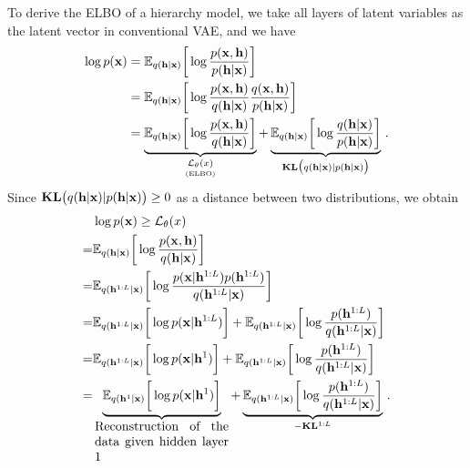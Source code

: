 \documentclass{article} %
\begin{document}
To derive the ELBO of a hierarchy model, we take all  layers of latent variables as the latent vector in conventional VAE, and we have 
\begin{align*}
\log p(\mathbf{x}) &=  \mathbb{E}_{q(\mathbf{h} | \mathbf{x})} \bigg[ \log  \frac{p(\mathbf{x}, \mathbf{h})}{p(\mathbf{h}|\mathbf{x})} \bigg] \\
&=  \mathbb{E}_{q(\mathbf{h} | \mathbf{x})} \bigg[ \log  \frac{p(\mathbf{x}, \mathbf{h})}{q(\mathbf{h}|\mathbf{x})}   \frac{q(\mathbf{x}, \mathbf{h})}{p(\mathbf{h}|\mathbf{x})} \bigg] \\
&=  \underbrace{\mathbb{E}_{q(\mathbf{h} | \mathbf{x})} \bigg[ \log  \frac{p(\mathbf{x}, \mathbf{h})}{q(\mathbf{h}|\mathbf{x})}  \bigg]}_{\underset{\text{(ELBO)}}{\mathcal{L}_{\theta}(x)}} +   \underbrace{\mathbb{E}_{q(\mathbf{h} | \mathbf{x})} \bigg[ \log \frac{q(\mathbf{h} |\mathbf{x})}{p(\mathbf{h}|\mathbf{x})} \bigg]}_{\textbf{\text{KL}}\big(q(\mathbf{h} |\mathbf{x}) | p(\mathbf{h}|\mathbf{x})\big)} \, .
\end{align*}
Since $\textbf{\text{KL}}\big(q(\mathbf{h} |\mathbf{x}) | p(\mathbf{h}|\mathbf{x})\big) \geq 0$ as a distance between two distributions, we obtain
\begin{align}  \label{eq:tree_elbo}
&\log p(\mathbf{x})  \geq  \mathcal{L}_{\theta}(x) \\  \notag
=&  \mathbb{E}_{q(\mathbf{h} | \mathbf{x})} \bigg[ \log  \frac{p(\mathbf{x}, \mathbf{h})}{q(\mathbf{h}|\mathbf{x})}  \bigg]  \\  \notag
=&  \mathbb{E}_{q(\mathbf{h}^{1:L} | \mathbf{x})} \bigg[ \log  \frac{p(\mathbf{x} | \mathbf{h}^{1:L}) p( \mathbf{h}^{1:L})}{q(\mathbf{h}^{1:L}|\mathbf{x})}  \bigg]  \\   \notag
 =&  \mathbb{E}_{q(\mathbf{h}^{1:L} | \mathbf{x})} \bigg[  \log p(\mathbf{x} | \mathbf{h}^{1:L})  \bigg]  +  \mathbb{E}_{q(\mathbf{h}^{1:L} | \mathbf{x})} \bigg[ \log   \frac{p( \mathbf{h}^{1:L})}{q(\mathbf{h}^{1:L}|\mathbf{x})}  \bigg]   \\    \label{eq:layer0_a}
=&  \mathbb{E}_{q(\mathbf{h}^{1:L} | \mathbf{x})} \bigg[ \log p(\mathbf{x} | \mathbf{h}^{1})  \bigg]  +  \mathbb{E}_{q(\mathbf{h}^{1:L} | \mathbf{x})} \bigg[ \log     \frac{p( \mathbf{h}^{1:L})}{q(\mathbf{h}^{1:L}|\mathbf{x})}  \bigg]  \\ 
=&  \underbrace{ \mathbb{E}_{q(\mathbf{h}^{1} | \mathbf{x})} \bigg[ \log  p(\mathbf{x} | \mathbf{h}^{1})  \bigg] }_{  \parbox{10.5em}{Reconstruction of the data given hidden layer 1}}  +  \underbrace{  \mathbb{E}_{q(\mathbf{h}^{1:L} | \mathbf{x})} \bigg[ \log  \frac{p( \mathbf{h}^{1:L})}{q(\mathbf{h}^{1:L}|\mathbf{x})}  \bigg] }_{-\textbf{\text{KL}}^{1:L}} \, .     \label{eq:layer0_b}
\end{align}
\end{document}
